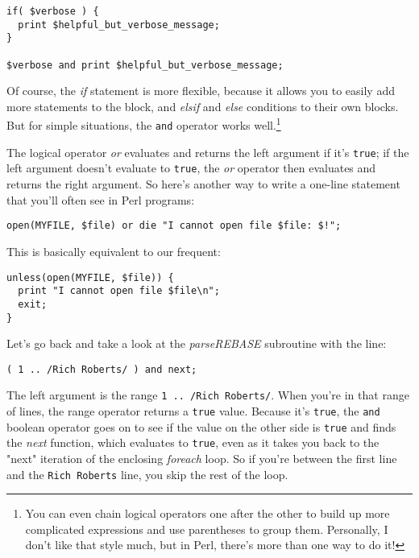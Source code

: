 \begin{lstlisting}
if( $verbose ) {
  print $helpful_but_verbose_message;
}

$verbose and print $helpful_but_verbose_message;
\end{lstlisting}

Of course, the \textit{if} statement is more flexible, because it allows you to easily add more statements to the block, and \textit{elsif} and \textit{else} conditions to their own blocks. But for simple situations, the \verb|and| operator works well.\footnote{You can even chain logical operators one after the other to build up more complicated expressions and use parentheses to group them. Personally, I don't like that style much, but in Perl, there's more than one way to do it!}

The logical operator \textit{or} evaluates and returns the left argument if it's \verb|true|; if the left argument doesn't evaluate to \verb|true|, the \textit{or} operator then evaluates and returns the right argument. So here's another way to write a one-line statement that you'll often see in Perl programs: 

\begin{lstlisting}
open(MYFILE, $file) or die "I cannot open file $file: $!";
\end{lstlisting}

This is basically equivalent to our frequent:

\begin{lstlisting}
unless(open(MYFILE, $file)) {
  print "I cannot open file $file\n";
  exit;
}
\end{lstlisting}

Let's go back and take a look at the \textit{parseREBASE} subroutine with the line: 

\begin{lstlisting}
( 1 .. /Rich Roberts/ ) and next;
\end{lstlisting}

The left argument is the range \verb|1 .. /Rich Roberts/|. When you're in that range of lines, the range operator returns a \verb|true| value. Because it's \verb|true|, the \verb|and| boolean operator goes on to see if the value on the other side is \verb|true| and finds the \textit{next} function, which evaluates to \verb|true|, even as it takes you back to the "next" iteration of the enclosing \textit{foreach} loop. So if you're between the first line and the \verb|Rich Roberts| line, you skip the rest of the loop.  

